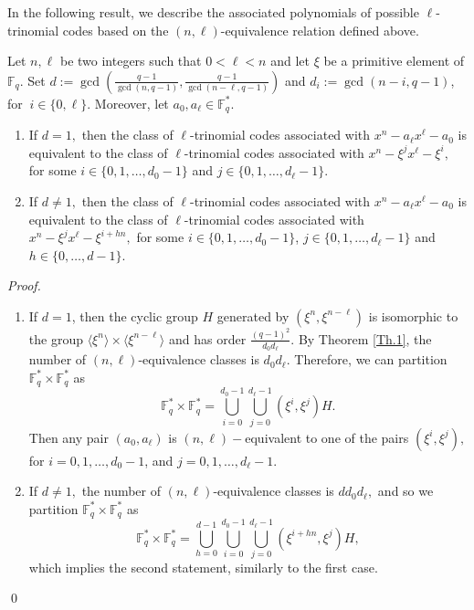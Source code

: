 \documentclass[12pt]{elsarticle}
\newcommand{\Fq}{\mathbb{F}_{q}}
\theoremstyle{break}
{\theorembodyfont{\upshape}
    \newtheorem{theorem}{Theorem}[section] %
    \newtheorem{lemma}[theorem]{Lemma} %
    \newtheorem{proposition}[theorem]{Proposition}
    \newtheorem{corollary}[theorem]{Corollary}
    \newtheorem{definition}[theorem]{Definition}
    \newtheorem{example}[theorem]{Example}
    \newtheorem{remark}[theorem]{Remark}
    \newtheorem{conjecture}[theorem]{Conjecture}
    \newtheorem*{proof}{{Proof}}
	\newtheorem*{notation}{Notation}
	\newtheorem*{main}{Cain Theorem}
	\newtheorem*{problem}{Problem}
}
\begin{document}
  In the following result, we describe the associated polynomials of possible $\ell$-trinomial codes based on the $(n,\ell)$-equivalence relation defined above.
\begin{theorem}
     \label{Equiv_2}
 Let $n, \ell$ be two integers such that $0<\ell<n$ and let $\xi$ be  a primitive element of $\Fq$.  Set  $ d:=\gcd \left(\frac{q-1}{ \gcd(n,q-1)}, \frac{q-1}{ \gcd(n-\ell,q-1)}\right)$  and $ d_i:=\gcd(n-i,q-1)$, for $ \ i\in \{0,\ell\}$. Moreover, let $a_0,a_\ell \in \Fq^*$. 
 \begin{enumerate}
     \item  If $d=1,$ then the class of $\ell$-trinomial codes associated with $x^n-a_{\ell}x^{\ell}-a_0$ is equivalent to the class of $ \ell$-trinomial codes associated with $x^n-\xi^j x^{\ell}- \xi^i,$ for some $i\in \{0,1,\ldots, d_0-1 \}$ and $ j\in \{0,1,\ldots, d_{\ell}-1\}$. 
    \item    If $d\neq 1,$ then the class of $\ell$-trinomial codes associated with $x^n-a_{\ell}x^{\ell}-a_0$ is equivalent to the class of $ \ell$-trinomial codes associated with  $x^n-\xi^{j} x^{\ell}- \xi^{i+hn},$ for some $i\in\{0,1,\ldots, d_0-1\}$,  $j\in \{0,1,\ldots, d_{\ell}-1\}$  and $ h\in \{0,\ldots, d-1\}$.  
 \end{enumerate}
\end{theorem}

\begin{proof}
\begin{enumerate}
    \item  If $ d = 1 $, then the cyclic group $ H $ generated by $ (\xi^n, \xi^{n-\ell}) $ is isomorphic to the group $ \langle \xi^n \rangle \times \langle \xi^{n-\ell} \rangle $ and has order $ \frac{(q-1)^2}{d_0 d_{\ell}} $. By Theorem \ref{Th.1}, the number of $ (n, \ell) $-equivalence classes is $ d_0 d_{\ell} $. Therefore, we can partition $ \Fq^* \times \Fq^* $ as 
$$
\Fq^* \times \Fq^* =  \bigcup_{i=0}^{d_0-1} \bigcup_{j=0}^{d_{\ell}-1} (\xi^i, \xi^j) H.
$$
Then any pair $(a_0,a_{\ell})$ is $(n,\ell)-$equivalent to one of the pairs   $(\xi^i, \xi^j), $ for  $i=0,1,\ldots, d_0-1$, and  $j=0,1,\ldots, d_{\ell}-1$. 

 \item 
 If $d\neq 1, $ the number of  $(n,\ell)$-equivalence classes is $ d d_0 d_{\ell} ,$ and so we partition $ \Fq^* \times \Fq^* $ as 
$$  \Fq^{*}\times \Fq^{*} = \bigcup_{h=0}^{d-1}  \bigcup_{i=0}^{d_0-1} \bigcup_{j=0}^{d_{\ell}-1} (\xi^{i+hn} ,\xi^{j}) H , $$
which implies the second statement, similarly to the first case.
\end{enumerate}
  \qed
\end{proof} 
\end{document}
